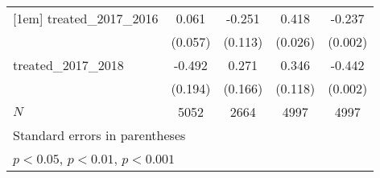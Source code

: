 {\begin{tabular}{l*{4}{c}}
[1em]
treated\_2017\_2016&       0.061         &      -0.251\sym{*}  &       0.418\sym{***}&      -0.237\sym{***}\\
            &     (0.057)         &     (0.113)         &     (0.026)         &     (0.002)         \\
[1em]
treated\_2017\_2018&      -0.492\sym{*}  &       0.271         &       0.346\sym{**} &      -0.442\sym{***}\\
            &     (0.194)         &     (0.166)         &     (0.118)         &     (0.002)         \\
\hline
\(N\)       &        5052         &        2664         &        4997         &        4997         \\
\hline\hline
\multicolumn{5}{l}{\footnotesize Standard errors in parentheses}\\
\multicolumn{5}{l}{\footnotesize \sym{*} \(p<0.05\), \sym{**} \(p<0.01\), \sym{***} \(p<0.001\)}\\
\end{tabular}
}
